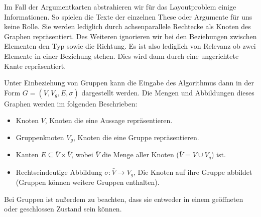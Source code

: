 Im Fall der Argumentkarten abstrahieren wir für das Layoutproblem einige Informationen. 
So spielen die Texte der einzelnen These oder Argumente für uns keine Rolle. 
Sie werden lediglich durch achsenparallele Rechtecke als Knoten des Graphen repräsentiert.
Des Weiteren ignorieren wir bei den Beziehungen zwischen Elementen den Typ sowie die Richtung. 
Es ist also lediglich von Relevanz ob zwei Elemente in einer Beziehung stehen.
Dies wird dann durch eine ungerichtete Kante repräsentiert. 

Unter Einbeziehung von Gruppen kann die Eingabe des Algorithmus dann in der Form $G = (V,V_g,E,\sigma)$ dargestellt werden. Die Mengen und Abbildungen dieses Graphen werden im folgenden Beschrieben:
\begin{itemize}
	\item Knoten $V$, Knoten die eine Aussage repräsentieren.
	\item Gruppenknoten $V_g$, Knoten die eine Gruppe repräsentieren.
	\item Kanten $E \subseteq \bar{V} \times \bar{V}$, wobei $\bar{V}$ die Menge aller Knoten ($\bar{V} = V \cup V_g$) ist.
	 \item Rechtseindeutige Abbildung $\sigma: \bar{V} \rightarrow V_g$, Die Knoten auf ihre Gruppe abbildet (Gruppen können weitere Gruppen enthalten).
\end{itemize}

Bei Gruppen ist außerdem zu beachten, dass sie entweder in einem geöffneten oder geschlossen Zustand sein können.




